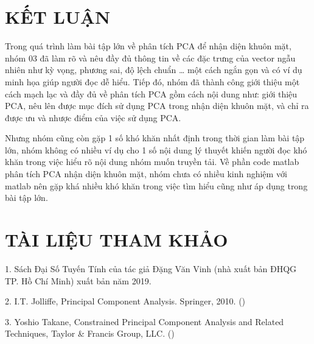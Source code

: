 \documentclass[12pt,a4paper]{article}
\begin{document}
\section{KẾT LUẬN}
Trong quá trình làm bài tập lớn về phân tích PCA để nhận diện khuôn mặt, nhóm 03 đã làm rõ và nêu đầy đủ thông tin về các đặc trưng của vector ngẫu nhiên như kỳ vọng, phương sai, độ lệch chuẩn … một cách ngắn gọn và có ví dụ minh họa giúp người đọc dễ hiểu. Tiếp đó, nhóm đã thành công giới thiệu một cách mạch lạc và đầy đủ về phân tích  PCA gồm cách nội dung như: giới thiệu PCA, nêu lên được mục đích sử dụng PCA trong nhận diện khuôn mặt, và chỉ ra được ưu và nhược điểm của việc sử dụng PCA.

Nhưng nhóm cũng còn gặp 1 số khó khăn nhất định trong thời gian làm bài tập lớn,  nhóm không có nhiều ví dụ cho 1 số nội dung lý thuyết khiến người đọc khó khăn trong việc hiểu rõ nội dung nhóm muốn truyền tải. Về phần code matlab phân tích PCA nhận diện khuôn mặt, nhóm chưa có nhiều kinh nghiệm với matlab nên gặp khá nhiều khó khăn trong việc tìm hiểu cũng như áp dụng trong bài tập lớn.
\section{TÀI LIỆU THAM KHẢO}
1. Sách Đại Số Tuyến Tính của tác giả Đặng Văn Vinh (nhà xuất bản ĐHQG TP. Hồ Chí Minh) xuất bản năm 2019.

2. I.T. Jolliffe, Principal Component Analysis. Springer, 2010. (\href{chrome-extension://efaidnbmnnnibpcajpcglclefindmkaj/http://cda.psych.uiuc.edu/statistical_learning_course/Jolliffe%20I.%20Principal%20Component%20Analysis%20(2ed.,%20Springer,%202002)(518s)_MVsa_.pdf}{\textcolor{Danube}{\textul{https://shorturl.at/TltCO}}})

3. Yoshio Takane, Constrained Principal Component Analysis and Related Techniques, Taylor \& Francis Group, LLC. (\href{chrome-extension://efaidnbmnnnibpcajpcglclefindmkaj/https://api.pageplace.de/preview/DT0400.9781466556683_A24034672/preview-9781466556683_A24034672.pdf}{\textcolor{Danube}{}})
\end{document}
